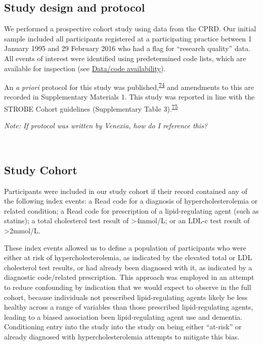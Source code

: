 \documentclass[a4paper, twoside]{templates/ociamthesis}
\begin{document}
\hypertarget{study-design-and-protocol}{%
\subsection{Study design and protocol}\label{study-design-and-protocol}}

We performed a prospective cohort study using data from the CPRD. Our initial sample included all participants registered at a participating practice between 1 January 1995 and 29 February 2016 who had a flag for ``research quality'' data. All events of interest were identified using predetermined code lists, which are available for inspection (see \protect\hyperlink{data-code-avail}{Data/code availability}).

An \emph{a priori} protocol for this study was published,\textsuperscript{\protect\hyperlink{ref-walker2016a}{74}} and amendments to this are recorded in Supplementary Materials 1. This study was reported in line with the STROBE Cohort guidelines (Supplementary Table 3).\textsuperscript{\protect\hyperlink{ref-vonelm2008}{75}}

\emph{Note: If protocol was written by Venexia, how do I reference this?}

~

\hypertarget{study-cohort}{%
\subsection{Study Cohort}\label{study-cohort}}

Participants were included in our study cohort if their record contained any of the following index events: a Read code for a diagnosis of hypercholesterolemia or related condition; a Read code for prescription of a lipid-regulating agent (such as statins); a total cholesterol test result of \textgreater4mmol/L; or an LDL-c test result of \textgreater2mmol/L.

These index events allowed us to define a population of participants who were either at risk of hypercholesterolemia, as indicated by the elevated total or LDL cholesterol test results, or had already been diagnosed with it, as indicated by a diagnostic code/related prescription. This approach was employed in an attempt to reduce confounding by indication that we would expect to observe in the full cohort, because individuals not prescribed lipid-regulating agents likely be less healthy across a range of variables than those prescribed lipid-regulating agents, leading to a biased association been lipid-regulating agent use and dementia. Conditioning entry into the study into the study on being either ``at-risk'' or already diagnosed with hypercholesterolemia attempts to mitigate this bias.
\end{document}
